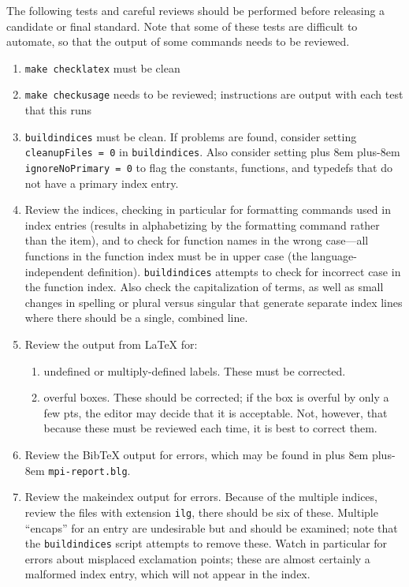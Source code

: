 \documentclass[letterpaper,twoside,11pt,fleqn]{article}
\def\gb{\penalty10000\hskip 0pt plus 8em\penalty4800\hskip 0pt plus-8em%
\penalty10000}
\begin{document}
The following tests and careful reviews should be performed before
releasing a candidate or final standard.
Note that some of these tests are difficult to automate, so that the
output of some commands needs to be reviewed.
\begin{enumerate}
\item \texttt{make checklatex} must be clean
\item \texttt{make checkusage} needs to be reviewed; instructions are
  output with each test that this runs
\item \texttt{buildindices} must be clean. If problems are found,
  consider setting \texttt{cleanupFiles = 0} in \texttt{buildindices}.
  Also consider setting \gb\texttt{ignoreNoPrimary = 0} to flag the
  constants, functions, and typedefs that do not have a primary index entry.
\item Review the indices, checking in particular for formatting
  commands used in index entries (results in alphabetizing by the
  formatting command rather than the item), and to check for function
  names in the wrong case---all functions in the function index must
  be in upper case (the language-independent
  definition). \texttt{buildindices} attempts to check for incorrect
  case in the function index.
  Also check the capitalization of terms, as well as small changes in
  spelling or plural versus singular that generate separate index
  lines where there should be a single, combined line.
\item Review the output from LaTeX for:
\begin{enumerate}
\item undefined or multiply-defined labels. These must be corrected.
\item overful boxes. These should be corrected; if the box is overful
  by only a few pts, the editor may decide that it is acceptable.
  Not, however, that because these must be reviewed each time, it is
  best to correct them.
\end{enumerate}
\item Review the BibTeX output for errors, which may be found in
  \gb\texttt{mpi-report.blg}.
\item Review the makeindex output for errors.  Because of the multiple
  indices, review the files with extension \texttt{ilg}, there should
  be six of these.
  Multiple ``encaps'' for an entry are undesirable but and should be
  examined; note that the \texttt{buildindices} script attempts to
  remove these.
  Watch in particular for errors about misplaced exclamation points;
  these are almost certainly a malformed index entry, which will not
  appear in the index.
\end{enumerate}
\end{document}
